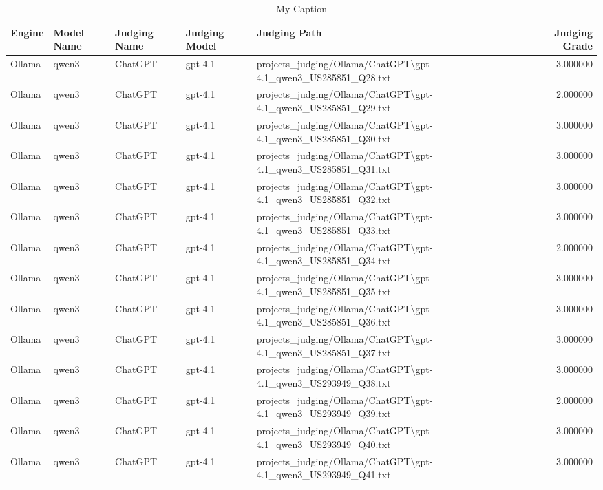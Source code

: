 \begin{table}[H]
\caption{My Caption}
\label{tbl:lr-results}
\begin{tabular}{lllllr}
\toprule
\textbf{Engine} & \textbf{Model Name} & \textbf{Judging Name} & \textbf{Judging Model} & \textbf{Judging Path} & \textbf{Judging Grade} \\
\midrule
Ollama & qwen3 & ChatGPT & gpt-4.1 & projects\_judging/Ollama/ChatGPT\textbackslash gpt-4.1\_qwen3\_US285851\_Q28.txt & 3.000000 \\
Ollama & qwen3 & ChatGPT & gpt-4.1 & projects\_judging/Ollama/ChatGPT\textbackslash gpt-4.1\_qwen3\_US285851\_Q29.txt & 2.000000 \\
Ollama & qwen3 & ChatGPT & gpt-4.1 & projects\_judging/Ollama/ChatGPT\textbackslash gpt-4.1\_qwen3\_US285851\_Q30.txt & 3.000000 \\
Ollama & qwen3 & ChatGPT & gpt-4.1 & projects\_judging/Ollama/ChatGPT\textbackslash gpt-4.1\_qwen3\_US285851\_Q31.txt & 3.000000 \\
Ollama & qwen3 & ChatGPT & gpt-4.1 & projects\_judging/Ollama/ChatGPT\textbackslash gpt-4.1\_qwen3\_US285851\_Q32.txt & 3.000000 \\
Ollama & qwen3 & ChatGPT & gpt-4.1 & projects\_judging/Ollama/ChatGPT\textbackslash gpt-4.1\_qwen3\_US285851\_Q33.txt & 3.000000 \\
Ollama & qwen3 & ChatGPT & gpt-4.1 & projects\_judging/Ollama/ChatGPT\textbackslash gpt-4.1\_qwen3\_US285851\_Q34.txt & 2.000000 \\
Ollama & qwen3 & ChatGPT & gpt-4.1 & projects\_judging/Ollama/ChatGPT\textbackslash gpt-4.1\_qwen3\_US285851\_Q35.txt & 3.000000 \\
Ollama & qwen3 & ChatGPT & gpt-4.1 & projects\_judging/Ollama/ChatGPT\textbackslash gpt-4.1\_qwen3\_US285851\_Q36.txt & 3.000000 \\
Ollama & qwen3 & ChatGPT & gpt-4.1 & projects\_judging/Ollama/ChatGPT\textbackslash gpt-4.1\_qwen3\_US285851\_Q37.txt & 3.000000 \\
Ollama & qwen3 & ChatGPT & gpt-4.1 & projects\_judging/Ollama/ChatGPT\textbackslash gpt-4.1\_qwen3\_US293949\_Q38.txt & 3.000000 \\
Ollama & qwen3 & ChatGPT & gpt-4.1 & projects\_judging/Ollama/ChatGPT\textbackslash gpt-4.1\_qwen3\_US293949\_Q39.txt & 2.000000 \\
Ollama & qwen3 & ChatGPT & gpt-4.1 & projects\_judging/Ollama/ChatGPT\textbackslash gpt-4.1\_qwen3\_US293949\_Q40.txt & 3.000000 \\
Ollama & qwen3 & ChatGPT & gpt-4.1 & projects\_judging/Ollama/ChatGPT\textbackslash gpt-4.1\_qwen3\_US293949\_Q41.txt & 3.000000 \\

\end{tabular}
\end{table}
